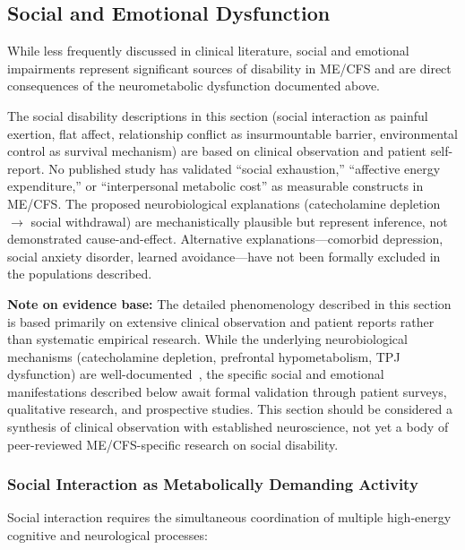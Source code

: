 \subsection{Social and Emotional Dysfunction}
\label{subsec:social-emotional-dysfunction}

While less frequently discussed in clinical literature, social and emotional impairments represent significant sources of disability in ME/CFS and are direct consequences of the neurometabolic dysfunction documented above.

\begin{limitation}
The social disability descriptions in this section (social interaction as painful exertion, flat affect, relationship conflict as insurmountable barrier, environmental control as survival mechanism) are based on clinical observation and patient self-report. No published study has validated ``social exhaustion,'' ``affective energy expenditure,'' or ``interpersonal metabolic cost'' as measurable constructs in ME/CFS. The proposed neurobiological explanations (catecholamine depletion $\to$ social withdrawal) are mechanistically plausible but represent inference, not demonstrated cause-and-effect. Alternative explanations---comorbid depression, social anxiety disorder, learned avoidance---have not been formally excluded in the populations described.
\end{limitation}

\textbf{Note on evidence base:} The detailed phenomenology described in this section is based primarily on extensive clinical observation and patient reports rather than systematic empirical research. While the underlying neurobiological mechanisms (catecholamine depletion, prefrontal hypometabolism, TPJ dysfunction) are well-documented~\cite{walitt2024deep}, the specific social and emotional manifestations described below await formal validation through patient surveys, qualitative research, and prospective studies. This section should be considered a synthesis of clinical observation with established neuroscience, not yet a body of peer-reviewed ME/CFS-specific research on social disability.

\subsubsection{Social Interaction as Metabolically Demanding Activity}

Social interaction requires the simultaneous coordination of multiple high-energy cognitive and neurological processes:

